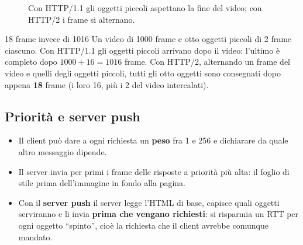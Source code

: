 \begin{figure}[H]
\centering
{}
\caption{Con HTTP/1.1 gli oggetti piccoli aspettano la fine del video; con HTTP/2 i frame si alternano.}
\end{figure}

\begin{esempio}{18 frame invece di 1016}
Un video di 1000 frame e otto oggetti piccoli di 2 frame ciascuno. Con HTTP/1.1 gli oggetti piccoli arrivano
dopo il video: l'ultimo è completo dopo $1000 + 16 = 1016$ frame. Con HTTP/2, alternando un frame del video e
quelli degli oggetti piccoli, tutti gli otto oggetti sono consegnati dopo appena \textbf{18} frame
(i loro 16, più i 2 del video intercalati).
\end{esempio}

\subsection{Priorità e server push}

\begin{itemize}
    \item Il client può dare a ogni richiesta un \textbf{peso} fra 1 e 256 e dichiarare da quale altro
          messaggio dipende.
    \item Il server invia per primi i frame delle risposte a priorità più alta: il foglio di stile prima
          dell'immagine in fondo alla pagina.
    \item Con il \textbf{server push} il server legge l'HTML di base, capisce quali oggetti serviranno e li
          invia \textbf{prima che vengano richiesti}: si risparmia un RTT per ogni oggetto ``spinto'', cioè la
          richiesta che il client avrebbe comunque mandato.
\end{itemize}

